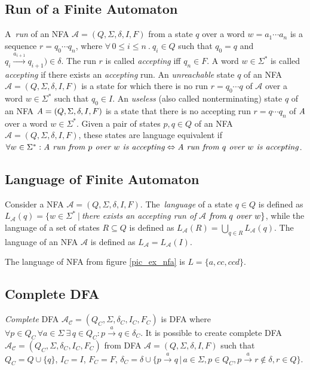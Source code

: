 	\subsection{Run of a Finite Automaton}
	\label{defRun}
  A~\emph{run} of an NFA $\mathcal{A}=(Q,\Sigma,\delta,I,F)$ from a state $q$
  over a word $w=a_1\cdots a_n$ is a sequence $r = q_0 \cdots q_n$, where $\forall\,0\leq i \leq n\ .\ q_i\in Q$ 
  such that $q_0=q$ and $q_i\xrightarrow{a_{i+1}}q_{i+1})\in \delta$. 
  The run $r$ is called \emph{accepting} iff $q_n \in F$. 
	A word $w \in \Sigma^{*}$ is called \emph{accepting} if there exists an \emph{accepting} run.
  An \emph{unreachable} state $q$ of an NFA $\mathcal{A}=(Q,\Sigma,\delta,I,F)$ is a state for which there is no run $r=q_0\cdots q$ of 
  $\mathcal{A}$ over a word $w \in \Sigma^{*}$ such that $q_0\in I$.
  An \emph{useless} (also called nonterminating) state $q$ of an NFA $\emph{A}=(Q,\Sigma,\delta,I,F)$ is a state that there is no accepting run $r=q\cdots q_n$ 
  of $\emph{A}$ over a word $w \in \Sigma^{*}$.
  Given a pair of states $p,q\in Q$ of an NFA $\mathcal{A}=(Q,\Sigma,\delta,I,F)$, these states are language equivalent if 
  $\forall w \in \Sigma^{*}: \emph{A run from } p \emph{ over } w \emph{ is accepting} \Leftrightarrow 
			\emph{A run from } q \emph{ over } w \emph{ is accepting}$.


  \subsection{Language of Finite Automaton}
  Consider a NFA $\mathcal{A}=(Q,\Sigma,\delta,I,F)$.
  The~\emph{language} of a state $q \in Q$ is defined as 
  $L_\mathcal{A}(q) = \{w\in \Sigma^{*}\ |\ $\emph{there exists an accepting run of }$
  \mathcal{A}$$ 
  \emph{ from }q\emph{ over }w\}$, while the language of a set of states $R\subseteq Q$ is defined as $L_{\mathcal{A}}(R)=\bigcup_{q\in R}L_{\mathcal{A}}(q)$.
  The language of an NFA $\mathcal{A}$ is defined as $L_{\mathcal{A}}=L_{\mathcal{A}}(I)$.

  The language of NFA from figure \ref{pic_ex_nfa} is $L=\{a,cc,ccd\}$.

  \subsection{Complete DFA}
  \label{defCompleteDFA}
  \emph{Complete} DFA $\mathcal{A_C}=(Q_C,\Sigma,\delta_C,I_C,F_C)$ is DFA where $\forall p\in Q_C\,\forall a\in \Sigma\ \exists\, q\in Q_C :
  p\xrightarrow{a}q\in\delta_C$. 
  It is possible to create complete DFA $\mathcal{A_C}=(Q_C,\Sigma,\delta_C,I_C,F_C)$ from DFA $\mathcal{A}=(Q,\Sigma,\delta,I,F)$ such that $Q_C=Q\cup\{q\}$, 
  $I_C=I$, $F_C=F$, 
  $\delta_C = \delta \cup \{p\xrightarrow{a}q\,|\,a\in\Sigma,p\in Q_C,p\xrightarrow{a}r\not\in\delta,r\in Q\}$.

